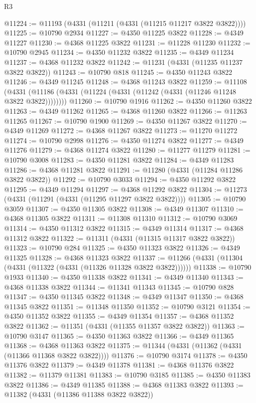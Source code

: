 \begin{lexlean}{R3}
\begin{coremodule}
@11224 := @11193 (@4331 (@11211 (@4331 (@11215 @11217 @3822 @3822))))
@11225 := @10790 @2934
@11227 := @4350 @11225 @3822
@11228 := @4349 @11227
@11230 := @4368 @11225 @3822
@11231 := @11228 @11230
@11232 := @10790 @2945
@11234 := @4350 @11232 @3822
@11235 := @4349 @11234
@11237 := @4368 @11232 @3822
@11242 := @11231 (@4331 (@11235 @11237 @3822 @3822))
@11243 := @10790 @818
@11245 := @4350 @11243 @3822
@11246 := @4349 @11245
@11248 := @4368 @11243 @3822
@11259 := @11108
    (@4331 (@11186 (@4331 (@11224 (@4331 (@11242 (@4331 (@11246 @11248 @3822 @3822))))))))
@11260 := @10790 @1916
@11262 := @4350 @11260 @3822
@11263 := @4349 @11262
@11265 := @4368 @11260 @3822
@11266 := @11263 @11265
@11267 := @10790 @1900
@11269 := @4350 @11267 @3822
@11270 := @4349 @11269
@11272 := @4368 @11267 @3822
@11273 := @11270 @11272
@11274 := @10790 @2998
@11276 := @4350 @11274 @3822
@11277 := @4349 @11276
@11279 := @4368 @11274 @3822
@11280 := @11277 @11279
@11281 := @10790 @3008
@11283 := @4350 @11281 @3822
@11284 := @4349 @11283
@11286 := @4368 @11281 @3822
@11291 := @11280 (@4331 (@11284 @11286 @3822 @3822))
@11292 := @10790 @3033
@11294 := @4350 @11292 @3822
@11295 := @4349 @11294
@11297 := @4368 @11292 @3822
@11304 := @11273 (@4331 (@11291 (@4331 (@11295 @11297 @3822 @3822))))
@11305 := @10790 @3059
@11307 := @4350 @11305 @3822
@11308 := @4349 @11307
@11310 := @4368 @11305 @3822
@11311 := @11308 @11310
@11312 := @10790 @3069
@11314 := @4350 @11312 @3822
@11315 := @4349 @11314
@11317 := @4368 @11312 @3822
@11322 := @11311 (@4331 (@11315 @11317 @3822 @3822))
@11323 := @10790 @284
@11325 := @4350 @11323 @3822
@11326 := @4349 @11325
@11328 := @4368 @11323 @3822
@11337 := @11266 (@4331 (@11304 (@4331 (@11322 (@4331 (@11326 @11328 @3822 @3822))))))
@11338 := @10790 @1933
@11340 := @4350 @11338 @3822
@11341 := @4349 @11340
@11343 := @4368 @11338 @3822
@11344 := @11341 @11343
@11345 := @10790 @828
@11347 := @4350 @11345 @3822
@11348 := @4349 @11347
@11350 := @4368 @11345 @3822
@11351 := @11348 @11350
@11352 := @10790 @3121
@11354 := @4350 @11352 @3822
@11355 := @4349 @11354
@11357 := @4368 @11352 @3822
@11362 := @11351 (@4331 (@11355 @11357 @3822 @3822))
@11363 := @10790 @3147
@11365 := @4350 @11363 @3822
@11366 := @4349 @11365
@11368 := @4368 @11363 @3822
@11375 := @11344 (@4331 (@11362 (@4331 (@11366 @11368 @3822 @3822))))
@11376 := @10790 @3174
@11378 := @4350 @11376 @3822
@11379 := @4349 @11378
@11381 := @4368 @11376 @3822
@11382 := @11379 @11381
@11383 := @10790 @3185
@11385 := @4350 @11383 @3822
@11386 := @4349 @11385
@11388 := @4368 @11383 @3822
@11393 := @11382 (@4331 (@11386 @11388 @3822 @3822))

\end{coremodule}
\end{lexlean}
